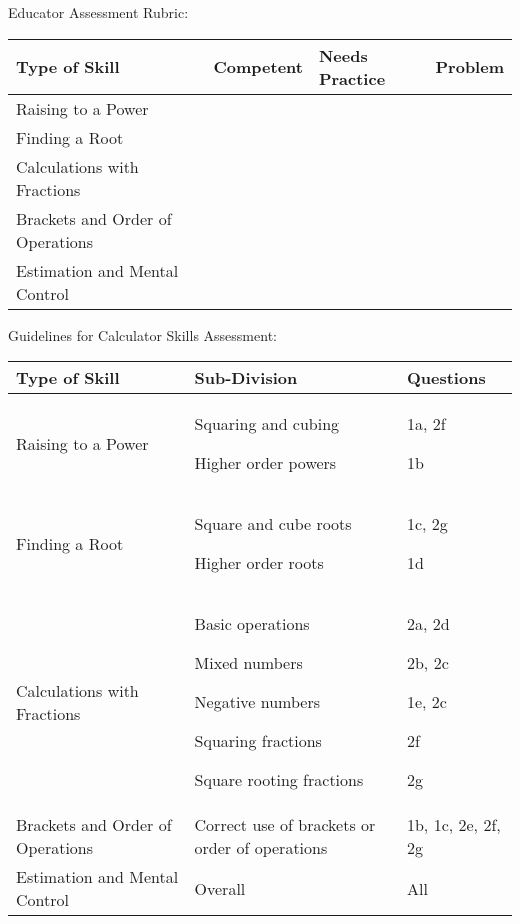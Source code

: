 Educator Assessment Rubric:
\begin{table}[H]
 \begin{center}
  \begin{tabular}{|p{4.5cm}|p{1.5cm}|p{3cm}|p{1.5cm}|} \hline

\textbf{Type of Skill} & \textbf{Competent} & \textbf{Needs Practice} & \textbf{Problem}   \\ \hline
Raising to a Power &&&\\ \hline
Finding a Root&&&\\ \hline
Calculations with Fractions&&&\\ \hline
Brackets and Order of Operations&&&\\ \hline
Estimation and Mental Control&&&\\ \hline
   
  \end{tabular}

 \end{center}

\end{table}
Guidelines for Calculator Skills Assessment:
\begin{table}[H]
 \begin{center}
  \begin{tabular}{|p{5cm}|p{4cm}|p{3cm}|} \hline

\textbf{Type of Skill} & \textbf{Sub-Division} & \textbf{Questions}   \\ \hline
Raising to a Power & Squaring and cubing\par Higher order powers&1a, 2f \par1b \\ \hline
Finding a Root&Square and cube roots \par Higher order roots & 1c, 2g \par 1d\\ \hline
Calculations with Fractions&Basic operations \par Mixed numbers \par Negative numbers \par Squaring fractions \par Square rooting fractions&2a,  2d\par
2b, 2c\par
1e, 2c\par
2f\par
2g
\\ \hline
Brackets and Order of Operations&Correct use of brackets or order of operations&1b, 1c, 2e, 2f, 2g\\ \hline
Estimation and Mental Control&Overall&All\\ \hline
   
  \end{tabular}

 \end{center}

\end{table}

